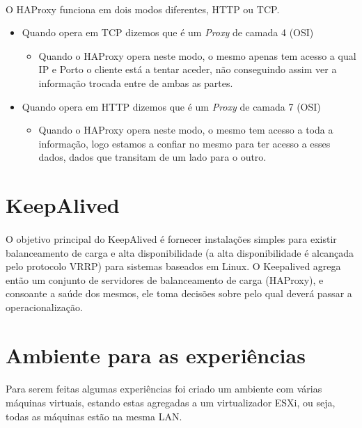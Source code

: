 \documentclass{report}
\begin{document}
\paragraph{}
O HAProxy funciona em dois modos diferentes, HTTP ou TCP.

\begin{itemize}
  \item Quando opera em TCP dizemos que é um \emph{Proxy} de camada 4 (OSI)
        \begin{itemize}
          \item Quando o HAProxy opera neste modo, o mesmo apenas tem acesso a qual IP e Porto o cliente está a tentar aceder, não conseguindo assim ver a informação trocada entre de ambas as partes.
        \end{itemize}
  \item Quando opera em HTTP dizemos que é um \emph{Proxy} de camada 7 (OSI)
    \begin{itemize}
      \item Quando o HAProxy opera neste modo, o mesmo tem acesso a toda a informação, logo estamos a confiar no mesmo para ter acesso a esses dados, dados que transitam de um lado para o outro.
        \end{itemize}
\end{itemize}


\section{KeepAlived}
\paragraph{}
O objetivo principal do KeepAlived é fornecer instalações simples para existir balanceamento de carga e alta disponibilidade (a alta disponibilidade é alcançada pelo protocolo VRRP) para sistemas baseados em Linux. O Keepalived agrega então um conjunto de servidores de balanceamento de carga (HAProxy), e consoante a saúde dos mesmos, ele toma decisões sobre pelo qual deverá passar a operacionalização.


\section{Ambiente para as experiências}
\paragraph{}
Para serem feitas algumas experiências foi criado um ambiente com várias máquinas virtuais, estando estas agregadas a um virtualizador ESXi, ou seja, todas as máquinas estão na mesma LAN.
\end{document}
